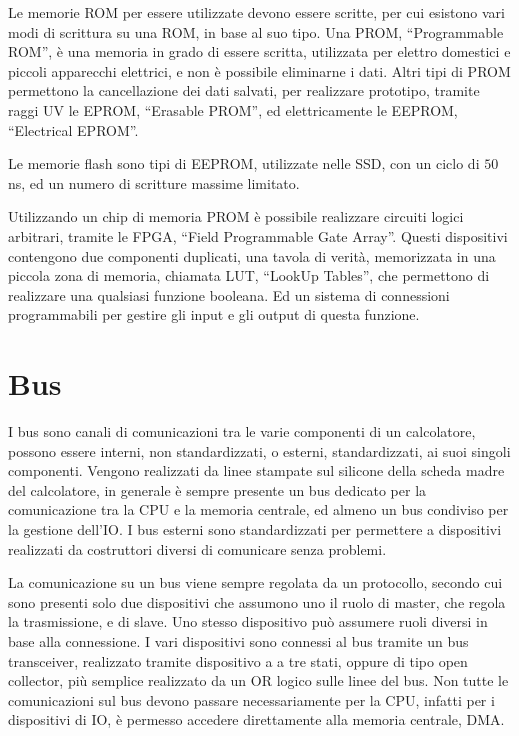 \documentclass{article}
\numberwithin{equation}{subsection}
\begin{document}
Le memorie ROM per essere utilizzate devono essere scritte, per cui esistono vari modi di scrittura su una ROM, in base al suo tipo. Una PROM, ``Programmable ROM'', è una memoria in grado di essere scritta, utilizzata 
per elettro domestici e piccoli apparecchi elettrici, e non è possibile eliminarne i dati. Altri tipi di PROM permettono la cancellazione dei dati salvati, per realizzare prototipo, tramite raggi UV le EPROM, ``Erasable 
PROM'', ed elettricamente le EEPROM, ``Electrical EPROM''. 

Le memorie flash sono tipi di EEPROM, utilizzate nelle SSD, con un ciclo di $50\,$ns, ed un numero di scritture massime limitato. 


Utilizzando un chip di memoria PROM è possibile realizzare circuiti logici arbitrari, tramite le FPGA, ``Field Programmable Gate Array''. Questi dispositivi contengono due componenti duplicati, una tavola 
di verità, memorizzata in una piccola zona di memoria, chiamata LUT, ``LookUp Tables'', che permettono di realizzare una qualsiasi funzione booleana. Ed un sistema di connessioni programmabili per gestire gli 
input e gli output di questa funzione. 

\clearpage

\section{Bus}

I bus sono canali di comunicazioni tra le varie componenti di un calcolatore, possono essere interni, non standardizzati, o esterni, standardizzati, ai suoi singoli componenti. 
Vengono realizzati da linee stampate sul silicone della scheda madre del calcolatore, in generale è sempre presente un bus dedicato per la comunicazione tra la CPU e la memoria 
centrale, ed almeno un bus condiviso per la gestione dell'IO. I bus esterni sono standardizzati per permettere a dispositivi realizzati da costruttori diversi di comunicare 
senza problemi. 


La comunicazione su un bus viene sempre regolata da un protocollo, secondo cui sono presenti solo due dispositivi che assumono uno il ruolo di master, che regola la 
trasmissione, e di slave. Uno stesso dispositivo può assumere ruoli diversi in base alla connessione. I vari dispositivi sono connessi al bus tramite un bus transceiver, 
realizzato tramite dispositivo a a tre stati, oppure di tipo open collector, più semplice realizzato da un OR logico sulle linee del bus. 
Non tutte le comunicazioni sul bus devono passare necessariamente per la CPU, infatti per i dispositivi di IO, è permesso accedere direttamente alla memoria centrale, DMA. 
\end{document}
